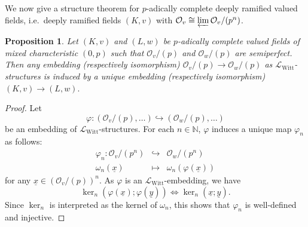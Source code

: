 \documentclass[a4paper]{amsart}
\theoremstyle{mystyle2}
\newtheorem{prop}[thm]{Proposition}
\theoremstyle{mystyle}
\renewcommand{\vec}[1]{\underline{#1}}
\newcommand{\map}[1]{\omega_{#1}}
\newcommand{\N}{\mathbb{N}}
\renewcommand{\L}{\mathcal{L}}
\newcommand{\LWitt}{\L_{\mathrm{Witt}}}
\renewcommand{\O}{\mathcal{O}}
\numberwithin{equation}{section}
\begin{document}
    We now give a structure theorem for 
    $p$-adically complete deeply ramified valued fields, i.e.\ deeply ramified fields
    $(K,v)$ with $\O_v \cong \varprojlim \O_v/(p^n)$.
    \begin{prop} \label{prop:lift}
        Let $(K,v)$ and $(L,w)$ be $p$-adically complete valued fields of mixed characteristic $(0,p)$
        such that $\O_v/(p)$ and $\O_w/(p)$ are semiperfect. 
        Then any embedding (respectively isomorphism)  
        $\O_v/(p) \to \O_w/(p)$ as $\LWitt$-structures is induced by a
        unique embedding (respectively
        isomorphism) $(K,v) \to (L,w).$
    \end{prop}
    \begin{proof}
        Let 
        \[
        \varphi\colon \left(\O_v/(p),\ldots\right) \hookrightarrow \left(\O_w/(p),\ldots\right)
        \]
        be an embedding of \(\LWitt\)-structures.
        For each \(n\in\N\), $\varphi$ induces a unique map \(\varphi_n\) as follows:
        \[
        \begin{array}{ccc}
            \varphi_n\colon \O_v/(p^n) & \hookrightarrow & \O_w/(p^n) \\
            \map{n}(\vec{x}) & \mapsto & \map{n}(\varphi(\vec{x}))
        \end{array}
        \]
        for any \(\vec{x}\in (\O_v/(p))^n\).
        As \(\varphi\) is an \(\LWitt\)-embedding, we have
        \[
        \ker_n(\varphi(\vec{x});\varphi(\vec{y})) \Leftrightarrow \ker_n(\vec{x};\vec{y}).
        \]
        Since \(\ker_n\) is interpreted as the kernel of \(\map{n}\), this shows that \(\varphi_n\) is well-defined and injective.
        

\end{proof}
\end{document}
